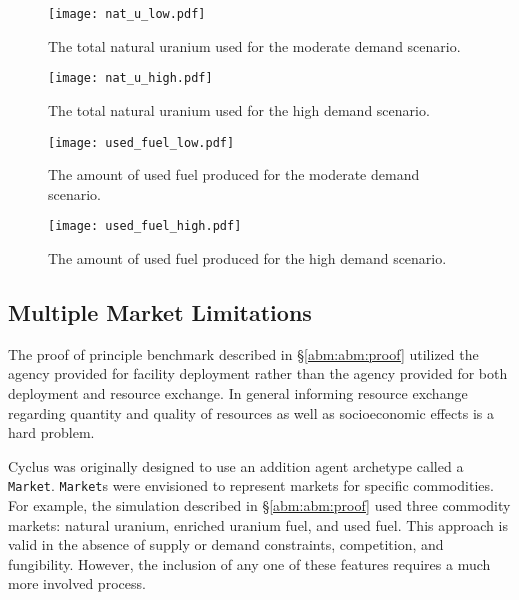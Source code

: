 \begin{figure}
\begin{center}
  \texttt{[image: nat\_u\_low.pdf]}
  \caption{The total natural uranium used for the moderate demand scenario.}
  \label{fig:nat_u_low}
\end{center}  
\end{figure}

\begin{figure}
\begin{center}
  \texttt{[image: nat\_u\_high.pdf]}
  \caption{The total natural uranium used for the high demand scenario.}
  \label{fig:nat_u_high}
\end{center}  
\end{figure}

\begin{figure}
  \begin{center}
    \texttt{[image: used\_fuel\_low.pdf]}
    \caption{The amount of used fuel produced for the moderate demand scenario.}
    \label{fig:used_fuel_low}
  \end{center}  
\end{figure}

\begin{figure}
  \begin{center}
    \texttt{[image: used\_fuel\_high.pdf]}
    \caption{The amount of used fuel produced for the high demand scenario.}
    \label{fig:used_fuel_high}
  \end{center}  
\end{figure}

\subsection{Multiple Market Limitations}\label{abm:abm:limits}

The proof of principle benchmark described in \S \ref{abm:abm:proof} utilized
the agency provided for facility deployment rather than the agency provided for
both deployment and resource exchange. In general informing resource exchange
regarding quantity and quality of resources as well as socioeconomic effects is
a hard problem.

Cyclus was originally designed to use an addition agent archetype called a
\texttt{Market}. \texttt{Market}s were envisioned to represent markets for specific
commodities. For example, the simulation described in \S \ref{abm:abm:proof}
used three commodity markets: natural uranium, enriched uranium fuel, and used
fuel. This approach is valid in the absence of supply or demand constraints,
competition, and fungibility. However, the inclusion of any one of these
features requires a much more involved process.

